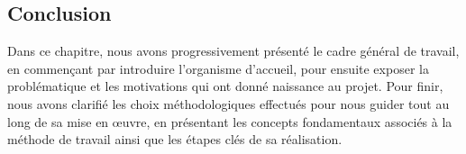 \begin{spacing}{1.5}
\section*{Conclusion}
Dans ce chapitre, nous avons progressivement présenté le cadre général de travail, en commençant par introduire l'organisme d'accueil, pour ensuite exposer la problématique et les motivations qui ont donné naissance au projet. Pour finir, nous avons clarifié les choix méthodologiques effectués pour nous guider tout au long de sa mise en œuvre, en présentant les concepts fondamentaux associés à la méthode de travail ainsi que les étapes clés de sa réalisation.


\end{spacing}
